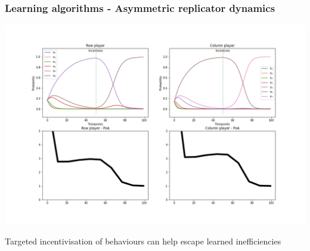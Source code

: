 \begin{frame}
    \frametitle{Learning algorithms - Asymmetric replicator dynamics}

    \includegraphics[scale=0.28]{Bin/replicator_dynamics/ARD_penalty_game.png}
    
\end{frame}


\begin{frame}
    \centering
    \Huge{
    Targeted incentivisation of behaviours can help escape learned inefficiencies
    }
\end{frame}
